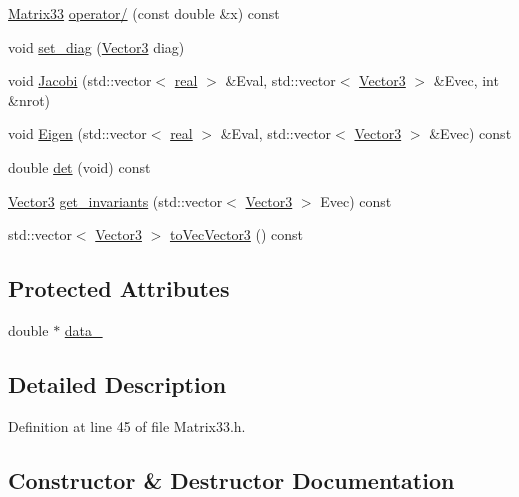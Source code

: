 \begin{DoxyCompactItemize}
\item 
\hyperlink{classMatrix33}{Matrix33} \hyperlink{classMatrix33_a637a80860f3d39dcc8b7d7110891d5b4}{operator/} (const double \&x) const 
\item 
void \hyperlink{classMatrix33_a2038be8fa888552ec7b1bf0ab1b12feb}{set\_\-diag} (\hyperlink{classVector3}{Vector3} diag)
\item 
void \hyperlink{classMatrix33_a564dc34febb2c4c76718c60ff7eb5e19}{Jacobi} (std::vector$<$ \hyperlink{Global_8h_a031f8951175b43076c2084a6c2173410}{real} $>$ \&Eval, std::vector$<$ \hyperlink{classVector3}{Vector3} $>$ \&Evec, int \&nrot)
\item 
void \hyperlink{classMatrix33_ae7c3a2bd71ef8d0024d2d122de4a6f0b}{Eigen} (std::vector$<$ \hyperlink{Global_8h_a031f8951175b43076c2084a6c2173410}{real} $>$ \&Eval, std::vector$<$ \hyperlink{classVector3}{Vector3} $>$ \&Evec) const 
\item 
double \hyperlink{classMatrix33_ad1bf7e69a69d1643a014cfdaa41e1493}{det} (void) const 
\item 
\hyperlink{classVector3}{Vector3} \hyperlink{classMatrix33_a9aa967ea6edb9d1f4084d81600be8f38}{get\_\-invariants} (std::vector$<$ \hyperlink{classVector3}{Vector3} $>$ Evec) const 
\item 
std::vector$<$ \hyperlink{classVector3}{Vector3} $>$ \hyperlink{classMatrix33_a55757dc718226a9326e8866e38fd20fe}{toVecVector3} () const 
\end{DoxyCompactItemize}
\subsection*{Protected Attributes}
\begin{DoxyCompactItemize}
\item 
double $\ast$ \hyperlink{classMatrix33_a65ba09e71156f079fa39e4ce7991648c}{data\_\-}
\end{DoxyCompactItemize}


\subsection{Detailed Description}


Definition at line 45 of file Matrix33.h.



\subsection{Constructor \& Destructor Documentation}
